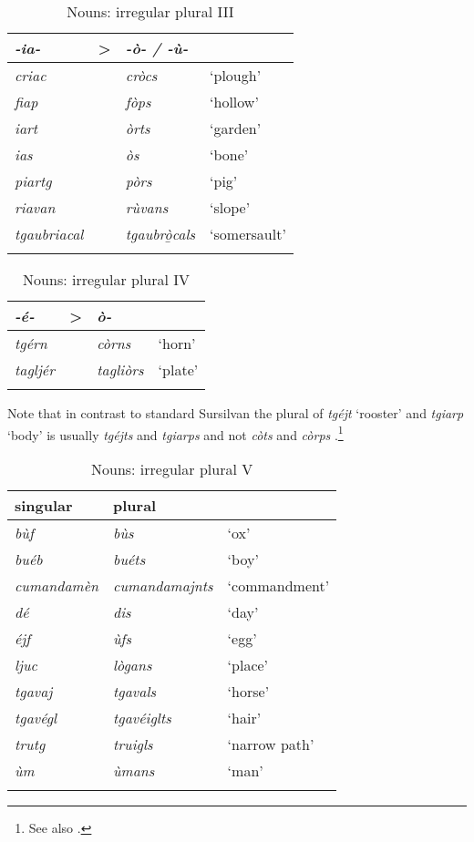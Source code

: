 \begin{table}
\caption{Nouns: irregular plural III} 
\label{irregplIII}
 \begin{tabular}{llll}
  \lsptoprule
   \textit{-ia-} & > & \textit{-ò- / -ù-} \\
  \midrule
\textit{criac} && \textit{cròcs} & `plough'\\
\textit{fiap} && \textit{fòps} & `hollow'\\
\textit{iart}  && \textit{òrts} & `garden'\\
\textit{ias} && \textit{òs} & `bone' \\
\textit{piartg} && \textit{pòrs} & `pig'\\
\textit{riavan} && \textit{rùvans} & `slope'\\
\textit{tgaubriacal} && \textit{tgaubrò̱cals} & `somersault'  \\
  \lspbottomrule
 \end{tabular}
\end{table}

\begin{table}
	\caption{Nouns: irregular plural IV} 
	\label{irregplIV}
	\begin{tabular}{llll}
		\lsptoprule
		 \textit{-é-} & > & \textit{ò-} & \\
		\midrule
		 \textit{tgérn} & & \textit{còrns} & `horn'\\
		 \textit{tagljér} & & \textit{tagliòrs} & `plate'\\
		\lspbottomrule
	\end{tabular}
\end{table}

Note that in contrast to standard Sursilvan the plural of \textit{tgéjt} `rooster' and \textit{tgiarp} `body' is usually \textit{tgéjts} and \textit{tgiarps} and not \textit{còts} and \textit{còrps} .\footnote{See also .}


\begin{table}
\caption{Nouns: irregular plural V}
\label{irregplV}
 \begin{tabular}{lll}
  \lsptoprule
singular & plural \\
  \midrule
\textit{bùf} & \textit{bùs} & `ox'\\
\textit{buéb} & \textit{buéts} & `boy'\\
\textit{cumandamèn} & \textit{cumandamajnts} & `commandment'\\
\textit{dé} & \textit{dis} & `day'\\
\textit{éjf} & \textit{ùfs} & `egg'\\
\textit{ljuc}  & \textit{lògans} & `place'\\
\textit{tgavaj} & \textit{tgavals} & `horse'\\
\textit{tgavégl} & \textit{tgavéiglts} & `hair'\\ 
\textit{trutg} & \textit{truigls} & `narrow path'\\
\textit{ùm} & \textit{ùmans} & `man'\\
  \lspbottomrule
 \end{tabular}
\end{table}

